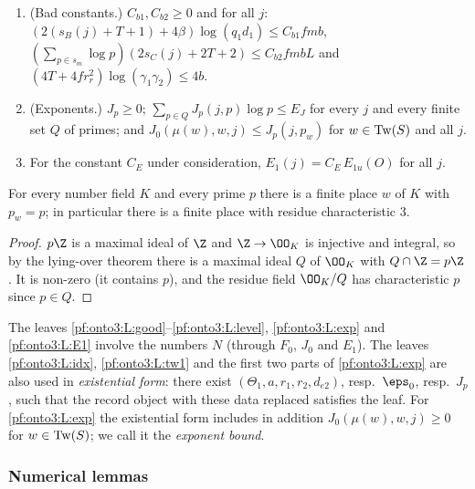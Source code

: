 \begin{definition}[Leaves]
\begin{enumerate}[label=(L\arabic*),leftmargin=*]
\item\label{pf:onto3:L:badc} (Bad constants.) $C_{b1},C_{b2}\ge0$ and for all $j$:
$(2(s_B(j)+T+1)+4\beta)\log(q_1d_1)\le C_{b1}fmb$, $(\sum_{p\in s_m}\log p)(2s_C(j)+2T+2)\le C_{b2}fmbL$ and
$(4T+4fr_r^2)\log(\gamma_1\gamma_2)\le4b$.
\item\label{pf:onto3:L:exp} (Exponents.) $J_p\ge0$; $\sum_{p\in Q}J_p(j,p)\log p\le E_J$ for every $j$ and every
finite set $Q$ of primes; and $J_0(\mu(w),w,j)\le J_p(j,p_w)$ for $w\in\mathrm{Tw}(S)$ and all $j$.
\item\label{pf:onto3:L:E1} For the constant $C_E$ under consideration, $E_1(j)=C_E\,E_{1u}(O)$ for all $j$.
\end{enumerate}
\end{definition}

\begin{lemma}\label{pf:onto3:place3}
For every number field $K$ and every prime $p$ there is a finite place $w$ of $K$ with $p_w=p$; in particular there is a
finite place with residue characteristic $3$.
\end{lemma}

\begin{proof}
$p\Z$ is a maximal ideal of $\Z$ and $\Z\to\OO_K$ is injective and integral, so by the lying-over theorem there is a
maximal ideal $Q$ of $\OO_K$ with $Q\cap\Z=p\Z$. It is non-zero (it contains $p$), and the residue field $\OO_K/Q$ has
characteristic $p$ since $p\in Q$.
\end{proof}


The leaves \ref{pf:onto3:L:good}--\ref{pf:onto3:L:level}, \ref{pf:onto3:L:exp} and \ref{pf:onto3:L:E1} involve the
numbers $N$ (through $F_0$, $J_0$ and $E_1$). The leaves \ref{pf:onto3:L:idx}, \ref{pf:onto3:L:tw1} and the first
two parts of \ref{pf:onto3:L:exp} are also used in \emph{existential form}: there exist $(\Theta_1,a,r_1,r_2,d_{e2})$,
resp.\ $\eps_0$, resp.\ $J_p$, such that the record object with these data replaced satisfies the leaf. For
\ref{pf:onto3:L:exp} the existential form includes in addition $J_0(\mu(w),w,j)\ge0$ for $w\in\mathrm{Tw}(S)$; we
call it the \emph{exponent bound}.

\subsubsection{Numerical lemmas}

